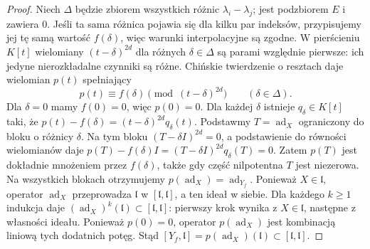 \begin{proof}
Niech $\Delta$ będzie zbiorem wszystkich różnic
$\lambda_i-\lambda_j$; jest podzbiorem $E$
i zawiera $0$. Jeśli ta sama różnica pojawia się
dla kilku par indeksów, przypisujemy jej tę samą
wartość $f(\delta)$, więc warunki interpolacyjne
są zgodne.
W pierścieniu $K[t]$ wielomiany $(t-\delta)^{2d}$
dla różnych $\delta\in\Delta$ są parami względnie
pierwsze: ich jedyne nierozkładalne czynniki są
różne. Chińskie twierdzenie o resztach daje
wielomian $p(t)$ spełniający
\[
 p(t)\equiv f(\delta)\pmod{(t-\delta)^{2d}}
 \qquad(\delta\in\Delta).
\]
Dla $\delta=0$ mamy $f(0)=0$, więc $p(0)=0$.
Dla każdej $\delta$ istnieje $q_\delta\in K[t]$
taki, że $p(t)-f(\delta)=(t-\delta)^{2d}q_\delta(t)$.
Podstawmy $T=\operatorname{ad}_X$ ograniczony do
bloku o różnicy $\delta$. Na tym bloku
$(T-\delta I)^{2d}=0$, a podstawienie do równości
wielomianów daje
$p(T)-f(\delta)I=(T-\delta I)^{2d}q_\delta(T)=0$.
Zatem $p(T)$ jest dokładnie mnożeniem przez
$f(\delta)$, także gdy część nilpotentna $T$ jest
niezerowa. Na wszystkich blokach otrzymujemy
$p(\operatorname{ad}_X)=\operatorname{ad}_{Y_f}$.
Ponieważ $X\in\mathfrak l$, operator
$\operatorname{ad}_X$ przeprowadza $\mathfrak l$
w $[\mathfrak l,\mathfrak l]$, a ten ideał w siebie.
Dla każdego $k\ge1$ indukcja daje
$(\operatorname{ad}_X)^k(\mathfrak l)
\subset[\mathfrak l,\mathfrak l]$:
pierwszy krok wynika z $X\in\mathfrak l$, następne
z własności ideału. Ponieważ $p(0)=0$, operator
$p(\operatorname{ad}_X)$ jest kombinacją liniową
tych dodatnich potęg. Stąd
$[Y_f,\mathfrak l]=p(\operatorname{ad}_X)(\mathfrak l)
\subset[\mathfrak l,\mathfrak l]$.


\end{proof}
